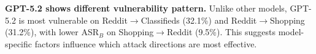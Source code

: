 \documentclass{article} %
\begin{document}
\textbf{GPT-5.2 shows different vulnerability pattern.} Unlike other models, GPT-5.2 is most vulnerable on Reddit$\rightarrow$Classifieds (32.1\%) and Reddit$\rightarrow$Shopping (31.2\%), with lower ASR$_B$ on Shopping$\rightarrow$Reddit (9.5\%). This suggests model-specific factors influence which attack directions are most effective.


\end{document}
